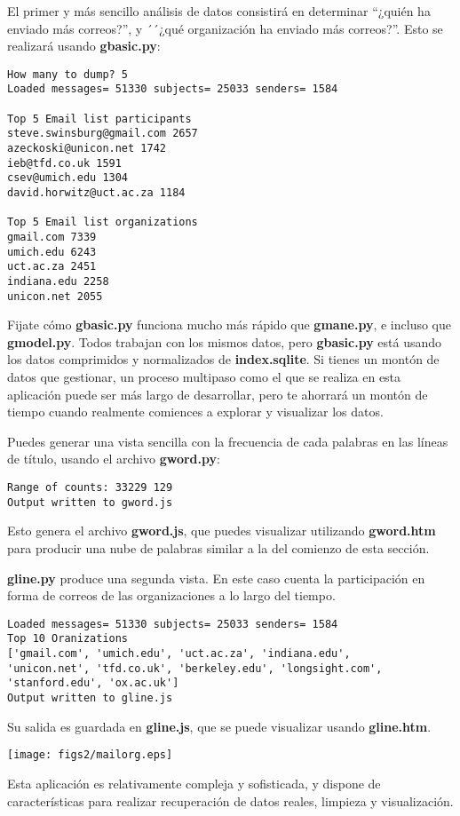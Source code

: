 El primer y más sencillo análisis de datos consistirá en determinar ``¿quién ha enviado más correos?'',
y ´´¿qué organización ha enviado más correos?''. Esto se realizará usando {\bf gbasic.py}:

\beforeverb
\begin{verbatim}
How many to dump? 5
Loaded messages= 51330 subjects= 25033 senders= 1584

Top 5 Email list participants
steve.swinsburg@gmail.com 2657
azeckoski@unicon.net 1742
ieb@tfd.co.uk 1591
csev@umich.edu 1304
david.horwitz@uct.ac.za 1184

Top 5 Email list organizations
gmail.com 7339
umich.edu 6243
uct.ac.za 2451
indiana.edu 2258
unicon.net 2055
\end{verbatim}
\afterverb
%
Fijate cómo {\bf gbasic.py} funciona mucho más rápido que {\bf gmane.py},
e incluso que {\bf gmodel.py}. Todos trabajan con los mismos datos, pero
{\bf gbasic.py} está usando los datos comprimidos y normalizados de
{\bf index.sqlite}. Si tienes un montón de datos que gestionar, un proceso
multipaso como el que se realiza en esta aplicación puede ser más largo de desarrollar,
pero te ahorrará un montón de tiempo cuando realmente comiences a explorar
y visualizar los datos.

Puedes generar una vista sencilla con la frecuencia de cada palabras en las
líneas de título, usando el archivo {\bf gword.py}:

\beforeverb
\begin{verbatim}
Range of counts: 33229 129
Output written to gword.js
\end{verbatim}
\afterverb
%
Esto genera el archivo {\bf gword.js}, que puedes visualizar utilizando
{\bf gword.htm} para producir una nube de palabras similar a la del comienzo
de esta sección. 

{\bf gline.py} produce una segunda vista. En este caso cuenta la participación
en forma de correos de las organizaciones a lo largo del tiempo.

\beforeverb
\begin{verbatim}
Loaded messages= 51330 subjects= 25033 senders= 1584
Top 10 Oranizations
['gmail.com', 'umich.edu', 'uct.ac.za', 'indiana.edu', 
'unicon.net', 'tfd.co.uk', 'berkeley.edu', 'longsight.com', 
'stanford.edu', 'ox.ac.uk']
Output written to gline.js
\end{verbatim}
\afterverb
%
Su salida es guardada en {\bf gline.js}, que se puede visualizar usando {\bf gline.htm}.

\beforefig
\centerline{\texttt{[image: figs2/mailorg.eps]}}
\afterfig

Esta aplicación es relativamente compleja y sofisticada, y
dispone de características para realizar recuperación de datos reales, limpieza y visualización.
